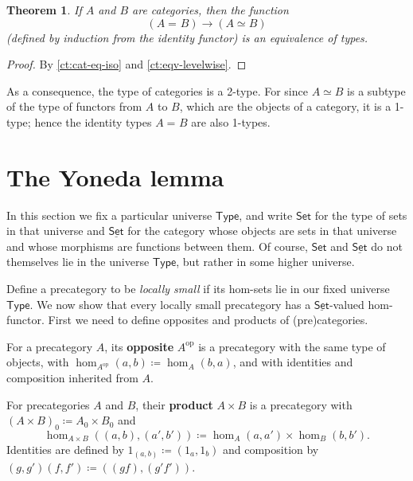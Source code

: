 \documentclass{mscs}
\newcommand{\defeq}{\coloneqq}  %
\newcommand{\id}[3][]{\ensuremath{#2 =_{#1} #3}\xspace}
\newcommand{\type}{\ensuremath{\mathsf{Type}}\xspace}
\renewcommand{\set}{\ensuremath{\mathsf{Set}}\xspace}
\newcommand{\uset}{\ensuremath{\underline{\set}}\xspace}
\newtheorem{thm}{Theorem}[section]
\numberwithin{equation}{section}
\newcommand{\op}{^{\textrm{op}}}
\begin{document}
\begin{thm}\label{ct:cat-2cat}
  If $A$ and $B$ are categories, then the function
  \[(\id A B) \to (A\simeq B)\]
  (defined by induction from the identity functor) is an equivalence of types.
\end{thm}
\begin{proof}
  By \autoref{ct:cat-eq-iso} and \autoref{ct:eqv-levelwise}.
\end{proof}

As a consequence, the type of categories is a 2-type.
For since $A\simeq B$ is a subtype of the type of functors from $A$ to $B$, which are the objects of a category, it is a 1-type; hence the identity types $\id A B$ are also 1-types.


\section{The Yoneda lemma}
\label{sec:yoneda}

In this section we fix a particular universe \type, and write \set for the type of sets in that universe and \uset for the category whose objects are sets in that universe and whose morphisms are functions between them.
Of course, \set and \uset do not themselves lie in the universe \type, but rather in some higher universe.

Define a precategory to be \emph{locally small} if its hom-sets lie in our fixed universe \type.
We now show that every locally small precategory has a \uset-valued hom-functor.
First we need to define opposites and products of (pre)categories.

\begin{defn}
  For a precategory $A$, its \textbf{opposite} $A\op$ is a precategory with the same type of objects, with $\hom_{A\op}(a,b) \defeq \hom_A(b,a)$, and with identities and composition inherited from $A$.
\end{defn}

\begin{defn}
  For precategories $A$ and $B$, their \textbf{product} $A\times B$ is a precategory with $(A\times B)_0 \defeq A_0 \times B_0$ and
  \[\hom_{A\times B}((a,b),(a',b')) \defeq \hom_A(a,a') \times \hom_B(b,b').\]
  Identities are defined by $1_{(a,b)}\defeq (1_a,1_b)$ and composition by $(g,g')(f,f') \defeq ((gf),(g'f'))$.
\end{defn}
\end{document}

